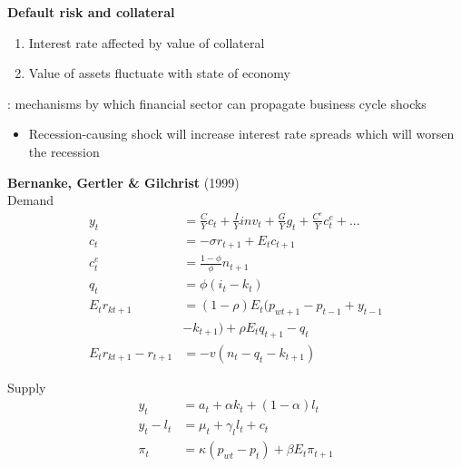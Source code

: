 \documentclass{beamer}
\begin{document}
\begin{frame}
 \textbf{Default risk and collateral}  
\begin{enumerate}
  \item Interest rate affected by value of collateral
  \item Value of assets fluctuate with state of economy
\end{enumerate}
 \medskip
 : mechanisms by which financial sector can propagate business cycle shocks 
 \begin{itemize}
   \item Recession-causing shock will increase interest rate spreads which will worsen the recession
 \end{itemize}
\end{frame}

\begin{frame}
\textbf{Bernanke, Gertler \& Gilchrist} (1999) \\
  Demand
\begin{align}
  y_t &= \frac{C}{Y}c_t + \frac{I}{Y}inv_t + \frac{G}{Y}g_t + \frac{C^e}{Y}c^e_t+...\\
  c_t &= -\sigma r_{t+1} + E_tc_{t+1}\\
  c^e_t &= \frac{1-\phi}{\phi}n_{t+1}\\
  q_t &= \phi(i_t-k_t)  \\
  E_tr_{kt+1} &= (1-\rho)E_t(p_{wt+1}-p_{t-1} + y_{t-1} \\ \nonumber &- k_{t+1}) + \rho E_tq_{t+1} -q_t\\
  E_tr_{kt+1} - r_{t+1} &= -v(n_t -q_t -k_{t+1})  
\end{align}
\end{frame}

\begin{frame}
  Supply
\begin{align}
  y_t &= a_t + \alpha k_t + (1-\alpha)l_t\\
  y_t-l_t &= \mu_t + \gamma_l l_t + c_t\\
  \pi_t &= \kappa (p_{wt}-p_t) + \beta E_t \pi_{t+1}
\end{align}
\end{frame}
\end{document}
